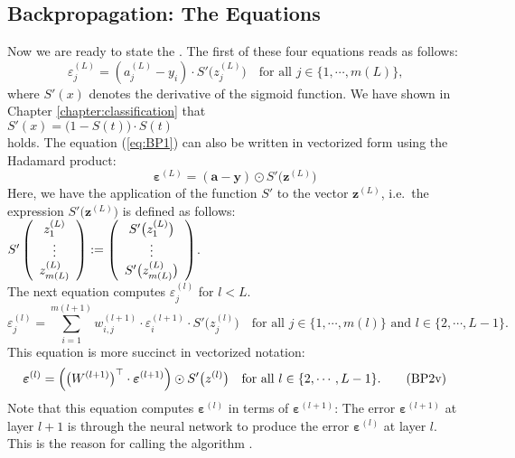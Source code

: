\subsection{Backpropagation: The Equations}
Now we are ready to state the .  The first of these four equations reads as follows:
\begin{equation}
  \label{eq:BP1}
  \varepsilon^{(L)}_j = (a_j^{(L)} - y_i) \cdot S'\bigl(z_j^{(L)}\bigr)
 \quad \mbox{for all $j \in \{1, \cdots, m(L)\}$,}
  \tag{BP1}
\end{equation}
where $S'(x)$ denotes the derivative of the sigmoid function.  We have shown in Chapter
\ref{chapter:classification} that
\\[0.2cm]
\hspace*{1.3cm}
$S'(x) = \bigl(1 - S(t)\bigr) \cdot S(t)$
\\[0.2cm]
holds.  The equation (\ref{eq:BP1}) can also be written in vectorized form using the Hadamard product:
\begin{equation}
  \label{eq:BP1s}
\boldsymbol{\varepsilon}^{(L)} = (\mathbf{a} - \mathbf{y}) \odot S'\bigl(\mathbf{z}^{(L)}\bigr)  
\tag{BP1v}
\end{equation}
Here, we have  the application of the function $S'$ to the vector $\mathbf{z}^{(L)}$, i.e.~the
expression $S'\bigl(\mathbf{z}^{(L)}\bigr)$ is defined as follows:
\\[0.2cm]
\hspace*{1.3cm}
$ S'\left(
  \begin{array}[c]{c}
   z_1^{(L)}      \\
   \vdots       \\
   z_{m(L)}^{(L)} 
  \end{array}
  \right) := \left(
  \begin{array}[c]{c}
   S'\bigl(z_1^{(L)}\bigr)      \\
   \vdots       \\
   S'\bigl(z_{m(L)}^{(L)}\bigr)
  \end{array}
  \right)
$.
\\[0.2cm]
The next equation computes $\varepsilon_j^{(l)}$ for $l < L$.  
\begin{equation}
  \label{eq:BP2}
  \varepsilon^{(l)}_j = \sum\limits_{i=1}^{m(l+1)} w_{i,j}^{(l+1)} \cdot \varepsilon^{(l+1)}_i \cdot
  S'\bigl(z^{(l)}_j\bigr) \quad \mbox{for all $j \in \{1, \cdots, m(l)\}$ and $l \in \{2, \cdots, L-1\}$}.
  \tag{BP2}
\end{equation}
This equation is more succinct in vectorized notation:
\begin{equation}
  \label{eq:BP2v}
  \boldsymbol{\varepsilon}^{(l)} = \Bigl(\bigl(W^{(l+1)}\bigr)^\top \cdot \boldsymbol{\varepsilon}^{(l+1)}\Bigr) \odot
  S'\bigl(z^{(l)}\bigr) \quad \mbox{for all $l \in \{2, \cdots, L-1\}$}.
  \tag{BP2v}
\end{equation}
Note that this equation computes $\boldsymbol{\varepsilon}^{(l)}$ in terms of  $\boldsymbol{\varepsilon}^{(l+1)}$:  The error 
$\boldsymbol{\varepsilon}^{(l+1)}$ at layer $l+1$ is  through the neural network to produce the
error $\boldsymbol{\varepsilon}^{(l)}$ at layer $l$.  This is the reason for calling the algorithm .

